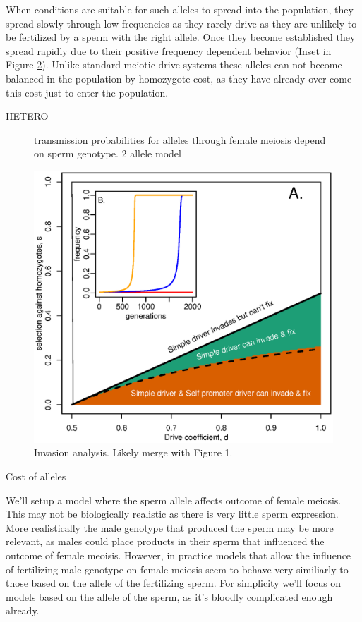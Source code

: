 \documentclass[12pt,letterpaper]{article}
\begin{document}
When conditions are suitable for such alleles to spread into the
population, they spread slowly through low frequencies as they rarely
drive as they are unlikely to be fertilized by a sperm with the right
allele. Once they become established they spread rapidly due to their
positive frequency dependent behavior (Inset in Figure \ref{Invasion_space}). 
Unlike standard meiotic drive systems 
these alleles can not become balanced in the population  by homozygote
cost, as they have already over come this cost just to enter the population.


HETERO

\begin{figure}
\caption{transmission probabilities for alleles through female
  meiosis depend on sperm genotype. 2 allele model}  
\label{Eggsperm_2_allele_cartoon}
\end{figure}

\begin{figure}
\includegraphics[width = 0.8 \textwidth]{Figures/invasion_space_recessive_driver.eps}
\caption{Invasion analysis. Likely merge with Figure 1.} \label{Invasion_space}
\end{figure}





Cost of alleles

We'll setup a model where the sperm allele affects outcome of female meiosis. This may not be biologically
realistic as there is very little sperm expression. More realistically the male genotype that produced the sperm
may be more relevant, as males could place products in their sperm that influenced the outcome of female meoisis.
However, in practice models that allow the influence of fertilizing male genotype on female meiosis 
seem to behave very similiarly to those based on the allele of the fertilizing sperm.
For simplicity we'll focus on models based on the allele of the sperm, as it's bloodly complicated enough already.
\end{document}
